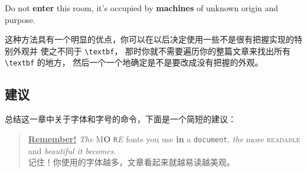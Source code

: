 \begin{example}
\newcommand{\oops}[1]{%
 \textbf{#1}}
Do not \oops{enter} this room,
it's occupied by \oops{machines}
of unknown origin and purpose.
\end{example}

这种方法具有一个明显的优点，你可以在以后决定使用一些不是很有把握实现的特别外观并
使之不同于 \verb|\textbf|，
那时你就不需要遍历你的整篇文章来找出所有 \verb|\textbf| 的地方，
然后一个一个地确定是不是要改成没有把握的外观。

\subsection{建议}

总结这一章中关于字体和字号的命令，下面是一个简短的建议：\nopagebreak
\begin{quote}
 \underline{\textbf{Remember\Huge!}} \textit{The}
 \textsf{M\textbf{\LARGE O} \texttt{R}\textsl{E}} fonts \Huge you
 \tiny use \footnotesize \textbf{in} a \small \texttt{document},
 \large \textit{the} \normalsize more \textsc{readable} and
 \textsl{\textsf{beautiful} it bec\large o\Large m\LARGE e\huge s}.\\
 记住！你使用的字体越多，文章看起来就越易读越美观。
\end{quote}

